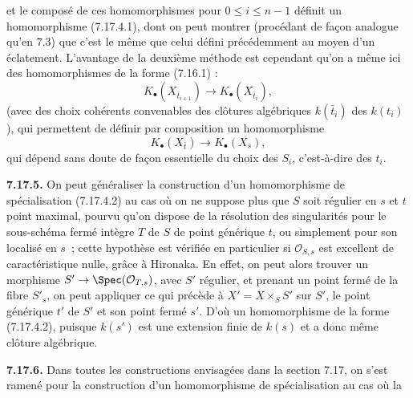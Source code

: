 et le
composé de ces homomorphismes pour \(0\leq i\leq n-1\) définit un homomorphisme (7.17.4.1), dont on peut montrer (procédant de façon analogue qu'en 7.3) que c'est le même que celui défini précédemment au moyen d'un éclatement. L'avantage de la deuxième méthode est cependant qu'on a même ici des homomorphismes de la forme (7.16.1) :
\[
  K_\bullet(X_{\bar t_{i+1}})\longrightarrow K_\bullet(X_{\bar t_i}),
\]
(avec des choix cohérents convenables des clôtures algébriques \(k(\bar t_i)\) des \(k(t_i)\)), qui permettent de définir par composition un homomorphisme
\begin{equation}\tag{7.17.4.2}
  K_\bullet(X_{\bar t})\longrightarrow K_\bullet(X_{\bar s}),
\end{equation}
qui dépend sans doute de façon essentielle du choix des \(S_i\), c'est-à-dire des \(t_i\).

\textbf{7.17.5.} On peut généraliser la construction d'un homomorphisme de spécialisation (7.17.4.2) au cas où on ne suppose plus que \(S\) soit régulier en \(s\) et \(t\) point maximal, pourvu qu'on dispose de la résolution des singularités pour le sous-schéma fermé intègre \(T\) de \(S\) de point générique \(t\), ou simplement pour son localisé en \(s\)~; cette hypothèse est vérifiée en particulier si \(\mathcal O_{S,s}\) est excellent de caractéristique nulle, grâce à Hironaka. En effet, on peut alors trouver un morphisme \(S'\to \Spec(\mathcal O_{T,s})\), avec \(S'\) régulier, et prenant un point fermé de la fibre \(S'_s\), on peut appliquer ce qui précède à \(X'=X\times_S S'\) sur \(S'\), le point générique \(t'\) de \(S'\) et son point fermé \(s'\). D'où un homomorphisme de la forme (7.17.4.2), puisque \(k(s')\) est une extension finie de \(k(s)\) et a donc même clôture algébrique.

\textbf{7.17.6.} Dans toutes les constructions envisagées dans la section 7.17, on s'est ramené pour la construction d'un homomorphisme de spécialisation au cas où la
